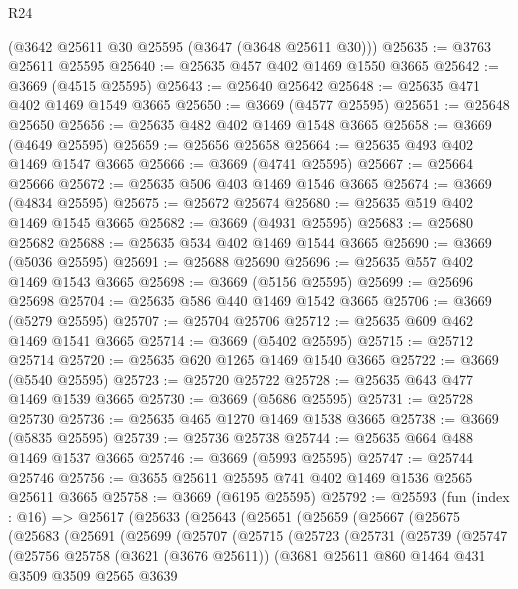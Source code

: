 \begin{lexlean}{R24}
\begin{coremodule}
    (@3642 @25611 @30 @25595 (@3647 (@3648 @25611 @30)))
@25635 := @3763 @25611 @25595
@25640 := @25635 @457 @402 @1469 @1550 @3665
@25642 := @3669 (@4515 @25595)
@25643 := @25640 @25642
@25648 := @25635 @471 @402 @1469 @1549 @3665
@25650 := @3669 (@4577 @25595)
@25651 := @25648 @25650
@25656 := @25635 @482 @402 @1469 @1548 @3665
@25658 := @3669 (@4649 @25595)
@25659 := @25656 @25658
@25664 := @25635 @493 @402 @1469 @1547 @3665
@25666 := @3669 (@4741 @25595)
@25667 := @25664 @25666
@25672 := @25635 @506 @403 @1469 @1546 @3665
@25674 := @3669 (@4834 @25595)
@25675 := @25672 @25674
@25680 := @25635 @519 @402 @1469 @1545 @3665
@25682 := @3669 (@4931 @25595)
@25683 := @25680 @25682
@25688 := @25635 @534 @402 @1469 @1544 @3665
@25690 := @3669 (@5036 @25595)
@25691 := @25688 @25690
@25696 := @25635 @557 @402 @1469 @1543 @3665
@25698 := @3669 (@5156 @25595)
@25699 := @25696 @25698
@25704 := @25635 @586 @440 @1469 @1542 @3665
@25706 := @3669 (@5279 @25595)
@25707 := @25704 @25706
@25712 := @25635 @609 @462 @1469 @1541 @3665
@25714 := @3669 (@5402 @25595)
@25715 := @25712 @25714
@25720 := @25635 @620 @1265 @1469 @1540 @3665
@25722 := @3669 (@5540 @25595)
@25723 := @25720 @25722
@25728 := @25635 @643 @477 @1469 @1539 @3665
@25730 := @3669 (@5686 @25595)
@25731 := @25728 @25730
@25736 := @25635 @465 @1270 @1469 @1538 @3665
@25738 := @3669 (@5835 @25595)
@25739 := @25736 @25738
@25744 := @25635 @664 @488 @1469 @1537 @3665
@25746 := @3669 (@5993 @25595)
@25747 := @25744 @25746
@25756 := @3655 @25611 @25595 @741 @402 @1469 @1536 @2565 @25611 @3665
@25758 := @3669 (@6195 @25595)
@25792 := @25593
    (fun (index : @16) =>
    @25617
      (@25633
        (@25643
          (@25651
            (@25659
              (@25667
                (@25675
                  (@25683
                    (@25691
                      (@25699
                        (@25707
                          (@25715
                            (@25723
                              (@25731
                                (@25739
                                  (@25747
                                    (@25756
                                      @25758
                                      (@3621 (@3676 @25611))
                                      (@3681
                                        @25611
                                        @860
                                        @1464
                                        @431
                                        @3509
                                        @3509
                                        @2565
                                        @3639

\end{coremodule}
\end{lexlean}
